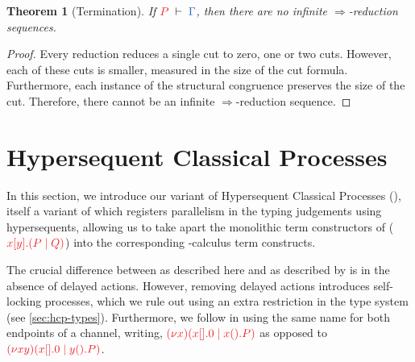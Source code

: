 \documentclass[submission,copyright,creativecommons]{eptcs}
\newtheorem{theorem}[lemma]{Theorem}
\begin{document}
\begin{theorem}[Termination]\label{thm:cp-termination}
  If $\seq[P]{\Gamma}$, then there are no infinite $\Longrightarrow$-reduction sequences.
\end{theorem} 
\begin{proof}
  Every reduction reduces a single cut to zero, one or two cuts. However, each of these cuts is smaller, measured in the size of the cut formula. Furthermore, each instance of the structural congruence preserves the size of the cut. Therefore, there cannot be an infinite $\Longrightarrow$-reduction sequence.
\end{proof}

\section{Hypersequent Classical Processes}
\label{sec:hcp}

In this section, we introduce our variant of Hypersequent Classical Processes (\hcp), itself a variant of \cp which registers parallelism in the typing judgements using hypersequents, allowing us to take apart the monolithic term constructors of \cp (\eg $\tm{\cpSend{x}{y}{P}{Q}}$) into the corresponding \textpi-calculus term constructs.

The crucial difference between \hcp as described here and \hcp as described by \citet{kokke2019} is in the absence of delayed actions. However, removing delayed actions introduces self-locking processes, which we rule out using an extra restriction in the type system (see \cref{sec:hcp-types}). Furthermore, we follow \cp in using the same name for both endpoints of a channel, writing, \eg $\tm{\cpCut{x}{\cpHalt{x}}{\cpWait{x}{P}}}$ as opposed to $\tm{\cpCut{xy}{\cpHalt{x}}{\cpWait{y}{P}}}$.
\end{document}
